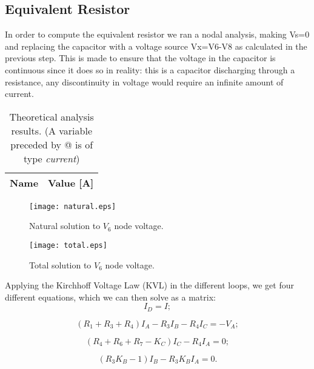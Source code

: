 \subsection{Equivalent Resistor}
In order to compute the equivalent resistor we ran a nodal analysis, making Vs=0 and replacing the capacitor with a voltage source Vx=V6-V8 as calculated in the previous step. This is made to ensure that the voltage in the capacitor is continuous since it does so in reality: this is a capacitor discharging through a resistance, any discontinuity in voltage would require an infinite amount of current. 

\begin{table}[h]
  \centering
  \begin{tabular}{|l|r|}
    \hline    
    {\bf Name} & {\bf Value [A]} \\ \hline
     
  \end{tabular}
  \caption{Theoretical analysis results. (A variable preceded by @ is of type {\em current})}
  \label{tab:nodal}
\end{table}

\begin{figure}[h] \centering
\texttt{[image: natural.eps]}
\caption{Natural solution to $V_{6}$ node voltage.}
\label{fig:current}
\end{figure}

\begin{figure}[h] \centering
\texttt{[image: total.eps]}
\caption{Total solution to $V_{6}$ node voltage.}
\label{fig:current}
\end{figure}

Applying the Kirchhoff Voltage Law (KVL) in the different loops, we get four different equations, which we can then solve as a matrix:
\begin{equation}
  I_D=I;
\end{equation}

\begin{equation}
  (R_1+R_3+R_4)I_A-R_3I_B-R_4I_C=-V_A;
\end{equation}

\begin{equation}
  (R_4+R_6+R_7-K_C)I_C-R_4I_A=0;
\end{equation}

\begin{equation}
  (R_3K_B-1)I_B-R_3K_BI_A=0.
\end{equation}

